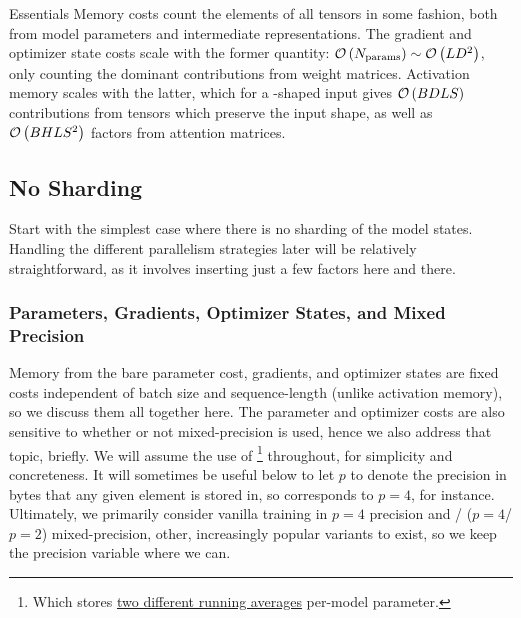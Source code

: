 \documentclass[11pt]{article}
\begin{document}
\begin{nicebox}{Essentials}
	Memory costs count the elements of all tensors in some fashion, both from model parameters and
	intermediate representations. The gradient and optimizer state costs scale with the former quantity:
	$ \mathcal{O} \left ( N _{ {\rm params}  } \right ) \sim \mathcal{O} \left ( L D ^{ 2 } \right )$, only counting
	the dominant contributions from weight matrices. Activation memory scales with the latter,
	which for a -shaped input gives $ \mathcal{O} \left ( BDLS  \right ) $ contributions
	from tensors which preserve the input shape, as well as $ \mathcal{O} \left( BHLS ^{ 2 } \right)  $
	factors from attention matrices.
\end{nicebox}


\subsection{No Sharding}

Start with the simplest case where there is no sharding of the model states. Handling the different
parallelism strategies later will be relatively straightforward, as it involves inserting just a few
factors here and there.

\subsubsection{Parameters, Gradients, Optimizer States, and Mixed Precision
	\label{sec_params_grads_optim_mem}}


Memory from the bare parameter cost, gradients, and optimizer states are fixed costs independent of
batch size and sequence-length (unlike activation memory), so we discuss them all together here. The
parameter and optimizer costs are also sensitive to whether or not mixed-precision is used, hence we
also address that topic, briefly.  We will assume the use of \footnote{Which stores
	\href{https://pytorch.org/docs/stable/generated/torch.optim.Adam.html}{two different running
		averages} per-model parameter.} throughout, for simplicity and concreteness. It will sometimes be
useful below to let $ p $ to denote the precision in bytes that any given element is stored in, so
 corresponds to $ p=4 $, for instance. Ultimately, we primarily consider
vanilla training in $ p=4 $ precision and / ($ p=4
$/ $ p=2 $)  mixed-precision, other, increasingly popular variants to exist, so we keep the
precision variable where we can.
\end{document}
